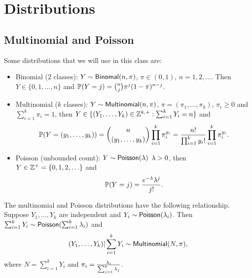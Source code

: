 \section{Distributions}
\subsection{Multinomial and Poisson}
Some distributions that we will use in this class are:
\begin{itemize}
    \item Binomial (2 classes): $Y \sim \mathsf{Binomal}(n,\pi)$, $\pi \in (0,1)$, $n=1,2,\ldots$. Then $Y \in \{0,1,\ldots,n\}$ and ${\mathbb{P}}(Y=j) = \binom{n}{j} \pi^j(1-\pi)^{n-j}$. 
    \item Multinomial ($k$ classes): $Y \sim \mathsf{Multinomial}(n,\pi)$, $\pi = (\pi_1,\ldots, \pi_k)$, $\pi_i \ge 0$ and $\sum_{i=1}^k \pi_i = 1$, then $Y \in \{(Y_1,\ldots,Y_k) \in {{\mathbb Z}}^{k,+}: \sum_{i=1}^k Y_i = n\}$ and 
    \[{\mathbb{P}}(Y=(y_1,\ldots,y_k)) = \binom{n}{(y_1,\ldots,y_k)} \prod_{i=1}^k \pi_i^{y_i} = \frac{n!}{\prod_{i=1}^k y_i!}\prod_{i=1}^k \pi_i^{y_i}.\]
    \item Poisson (unbounded count): $Y \sim \mathsf{Poisson}(\lambda) $ $\lambda > 0$, then $Y \in {{\mathbb Z}}^+ =\{0,1,2,\ldots\}$ and \[{\mathbb{P}}(Y=j) = \frac{e^{-\lambda}\lambda^j}{j!}.\]
\end{itemize}
The multinomial and Poisson distributions have the following relationship. Suppose $Y_1,\ldots,Y_k$ are independent and $Y_i \sim \mathsf{Poisson}(\lambda_i)$. Then $\sum_{i=1}^k Y_i \sim \mathsf{Poisson}(\sum_{i=1}^k \lambda_i)$ and 
\[(Y_1,\ldots, Y_k)|\sum_{i=1}^k Y_i \sim \mathsf{Multinomial}(N,\pi), \]
where $N=\sum_{i=1}^k Y_i$ and $\pi_i = \frac{\lambda_i}{\sum_{j=1}^k \lambda_j}$.
